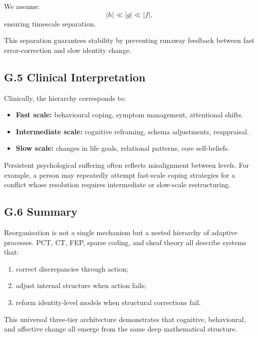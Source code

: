 \documentclass[11pt,a4paper,twoside]{article}
\begin{document}
We assume:
\[
|h| \ll |g| \ll |f|,
\]
ensuring timescale separation.

This separation guarantees stability by preventing runaway feedback between fast error-correction and slow identity change.

\subsection*{G.5 Clinical Interpretation}

Clinically, the hierarchy corresponds to:
\begin{itemize}
    \item \textbf{Fast scale:} behavioural coping, symptom management, attentional shifts.
    \item \textbf{Intermediate scale:} cognitive reframing, schema adjustments, reappraisal.
    \item \textbf{Slow scale:} changes in life goals, relational patterns, core self-beliefs.
\end{itemize}

Persistent psychological suffering often reflects misalignment between levels. For example, a person may repeatedly attempt fast-scale coping strategies for a conflict whose resolution requires intermediate or slow-scale restructuring.

\subsection*{G.6 Summary}

Reorganisation is not a single mechanism but a nested hierarchy of adaptive processes. PCT, CT, FEP, sparse coding, and sheaf theory all describe systems that:
\begin{enumerate}
    \item correct discrepancies through action;
    \item adjust internal structure when action fails;
    \item reform identity-level models when structural corrections fail.
\end{enumerate}

This universal three-tier architecture demonstrates that cognitive, behavioural, and affective change all emerge from the same deep mathematical structure.
\end{document}

